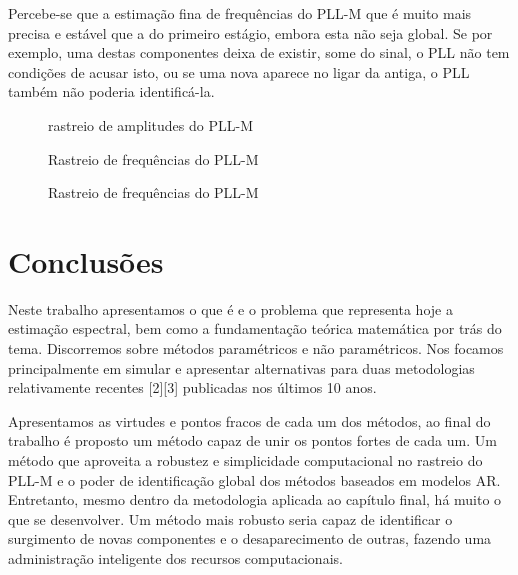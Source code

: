 \indent Percebe-se que a estimação fina de frequências do PLL-M que é muito mais precisa e estável que a do primeiro estágio, embora esta não seja global. Se por exemplo, uma destas componentes deixa de existir, some do sinal, o PLL não tem condições de acusar isto, ou se uma nova aparece no ligar da antiga, o PLL também não poderia identificá-la.

\begin{figure}[H]
	\centering    
	\def\svgwidth{\columnwidth}
	
	\caption{rastreio de amplitudes do PLL-M}
	\label{fig:rastreio_final}
\end{figure}

\begin{figure}[H]
	\centering    
	\def\svgwidth{\columnwidth}
	
	\caption{Rastreio de frequências do PLL-M}
	\label{fig:amplitudes}
\end{figure}
\begin{figure}[H]
	\centering    
	\def\svgwidth{\columnwidth}
	
	\caption{Rastreio de frequências do PLL-M}
	\label{fig:amplitudes}
\end{figure}


\section{Conclusões}

Neste trabalho apresentamos o que é e o problema que representa hoje a estimação espectral, bem como a fundamentação teórica matemática por trás do tema. Discorremos sobre métodos paramétricos e não paramétricos. Nos focamos principalmente em simular e apresentar alternativas para duas metodologias relativamente recentes [2][3] publicadas nos últimos 10 anos. 

Apresentamos as virtudes e pontos fracos de cada um dos métodos, ao final do trabalho é proposto um método capaz de unir os pontos fortes de cada um. Um método que aproveita a robustez e simplicidade computacional no rastreio do PLL-M e o poder de identificação global dos métodos baseados em modelos AR. Entretanto, mesmo dentro da metodologia aplicada ao capítulo final, há muito o que se desenvolver. Um método mais robusto seria capaz de identificar o surgimento de novas componentes e o desaparecimento de outras, fazendo uma administração inteligente dos recursos computacionais. 
